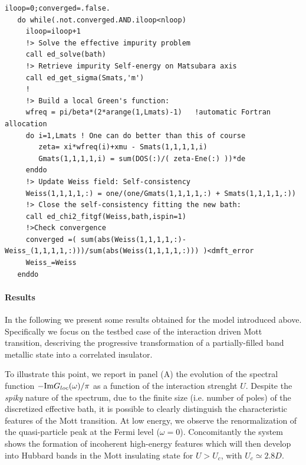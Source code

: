 \begin{lstlisting}[style=fstyle,numbers=none,basicstyle={\scriptsize\ttfamily}]
iloop=0;converged=.false.
   do while(.not.converged.AND.iloop<nloop)
     iloop=iloop+1     
     !> Solve the effective impurity problem
     call ed_solve(bath)     
     !> Retrieve impurity Self-energy on Matsubara axis
     call ed_get_sigma(Smats,'m')
     !
     !> Build a local Green's function:
     wfreq = pi/beta*(2*arange(1,Lmats)-1)   !automatic Fortran allocation
     do i=1,Lmats ! One can do better than this of course 
        zeta= xi*wfreq(i)+xmu - Smats(1,1,1,1,i)
        Gmats(1,1,1,1,i) = sum(DOS(:)/( zeta-Ene(:) ))*de  
     enddo
     !> Update Weiss field: Self-consistency
     Weiss(1,1,1,1,:) = one/(one/Gmats(1,1,1,1,:) + Smats(1,1,1,1,:))
     !> Close the self-consistency fitting the new bath:
     call ed_chi2_fitgf(Weiss,bath,ispin=1)     
     !>Check convergence
     converged =( sum(abs(Weiss(1,1,1,1,:)-Weiss_(1,1,1,1,:)))/sum(abs(Weiss(1,1,1,1,:))) )<dmft_error
     Weiss_=Weiss     
   enddo
\end{lstlisting}


\paragraph{Results}
In the following we present some results obtained for the model
introduced above. Specifically we focus on the testbed case of the interaction
driven Mott transition, descriving the progressive
transformation of a partially-filled band metallic state into a correlated insulator. 

To illustrate this point, we report in panel (A) the evolution of
the spectral function $-{\rm Im}G_{loc}(\omega)/\pi$ as a function of
the interaction strenght $U$. Despite the {\it spiky} nature of the spectrum, due to the
finite size (i.e. number of poles) of the discretized effective bath,
it is possible to clearly distinguish the characteristic features of
the Mott transition. At low energy, we observe the renormalization of the 
quasi-particle peak at the Fermi level ($\omega=0$). Concomitantly the
system shows the formation of incoherent  high-energy features which
will then develop into Hubbard bands in the Mott insulating state for $U>U_c$, with $U_c\simeq 2.8D$. 


